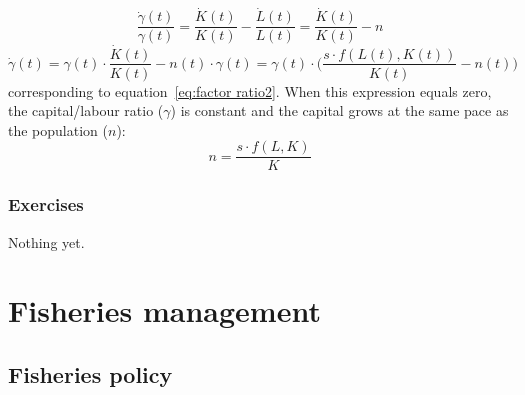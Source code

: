 \documentclass[11pt,fleqn]{book} %
\begin{document}
\begin{equation} 
\label{eq:factor ratio6}
\frac{\dot{\gamma}(t)}{\gamma(t)} = \frac{\dot{K}(t)}{K(t)} - \frac{\dot{L}(t)}{L(t)} = \frac{\dot{K}(t)}{K(t)} - n
\end{equation}
\begin{equation} 
\label{eq:factor ratio7}
\dot{\gamma}(t) = \gamma(t) \cdot \frac{\dot{K}(t)}{K(t)} - n(t) \cdot \gamma(t) = \gamma(t) \cdot \Big( \frac{s \cdot f(L(t), K(t))}{K(t)} - n(t) \Big)
\end{equation}
corresponding to equation~\ref{eq:factor ratio2}. When this expression equals zero, the capital/labour ratio ($\gamma$) is constant and the capital grows at the same pace as the population ($n$):
\begin{equation} 
\label{eq:factor ratio8}
n = \frac{s \cdot f(L, K)}{K}
\end{equation}


\section*{Exercises}

\begin{exercise}
Nothing yet.
\end{exercise}



\part{Fisheries management}

\chapter{Fisheries policy} \label{chapter 9}
\end{document}

